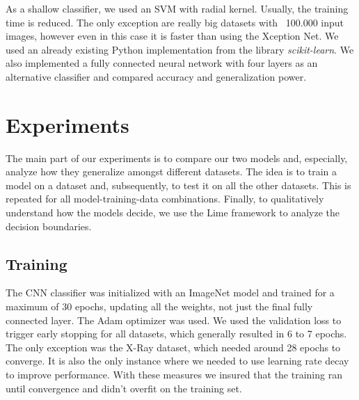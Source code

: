 \documentclass[11pt]{article}
\begin{document}
As a shallow classifier, we used an SVM with radial kernel. Usually, the training time is reduced. The only exception are really big datasets with ~100.000 input images, however even in this case it is faster than using the Xception Net. We used an already existing Python implementation from the library \textit{scikit-learn}\cite{scikit-learn}. We also implemented a fully connected neural network with four layers as an alternative classifier and compared accuracy and generalization power.


\section{Experiments}

The main part of our experiments is to compare our two models and, especially, analyze how they generalize amongst different datasets. The idea is to train a model on a dataset and, subsequently, to test it on all the other datasets. This is repeated for all model-training-data combinations. Finally, to qualitatively understand how the models decide, we use the Lime framework to analyze the decision boundaries.

\subsection{Training}
The CNN classifier was initialized with an ImageNet model and trained for a maximum of 30 epochs, updating all the weights, not just the final fully connected layer. The Adam optimizer was used. We used the validation loss to trigger early stopping for all datasets, which generally resulted in 6 to 7 epochs. The only exception was the X-Ray dataset, which needed around 28 epochs to converge. It is also the only instance where we needed to use learning rate decay to improve performance. With these measures we insured that the training ran until convergence and didn't overfit on the training set.
\end{document}
